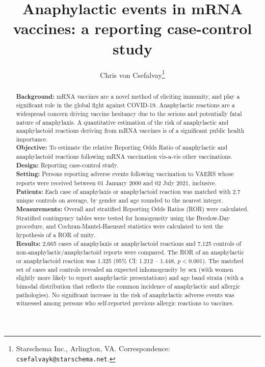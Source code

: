 \documentclass{article}
\title{Anaphylactic events in mRNA vaccines: a reporting case-control study}
\author{Chris von Csefalvay\thanks{Starschema Inc., Arlington, VA. Correspondence: \texttt{csefalvayk@starschema.net}.}}
\begin{document}
\maketitle

\onehalfspacing

\begin{abstract}
    \noindent \textbf{Background:}
        mRNA vaccines are a novel method of eliciting immunity, and play a significant role in the global fight against COVID-19.
        Anaphylactic reactions are a widespread concern driving vaccine hesitancy due to the serious and potentially fatal nature of anaphylaxis.
        A quantitative estimation of the risk of anaphylactic and anaphylactoid reactions deriving from mRNA vaccines is of a significant public health importance. \\
    \textbf{Objective:}
        To estimate the relative Reporting Odds Ratio of anaphylactic and anaphylactoid reactions following mRNA vaccination vis-a-vis other vaccinations. \\
    \textbf{Design:}
        Reporting case-control study. \\
    \textbf{Setting:}
        Persons reporting adverse events following vaccination to VAERS whose reports were received between 01 January 2000 and 02 July 2021, inclusive. \\
    \textbf{Patients:}
        Each case of anaphylaxis or anaphylactoid reaction was matched with 2.7 unique controls on average, by gender and age rounded to the nearest integer. \\
    \textbf{Measurements:}
        Overall and stratified Reporting Odds Ratios (ROR) were calculated.
        Stratified contingency tables were tested for homogeneity using the Breslow-Day procedure, and Cochran-Mantel-Haenszel statistics were calculated to test the hypothesis of a ROR of unity. \\
    \textbf{Results:}
        2,665 cases of anaphylaxis or anaphylactoid reactions and 7,125 controls of non-anaphylactic/anaphylactoid reports were compared.
        The ROR of an anaphylactic or anaphylactoid reaction was 1.325 (95\% CI: 1.212 -- 1.448, $p < 0.001$).
        The matched set of cases and controls revealed an expected inhomogeneity by sex (with women slightly more likely to report anaphylactic presentations) and age band strata (with a bimodal distribution that reflects the common incidence of anaphylactic and allergic pathologies).
        No significant increase in the risk of anaphylactic adverse events was witnessed among persons who self-reported previous allergic reactions to vaccines.

\end{abstract}
\end{document}
